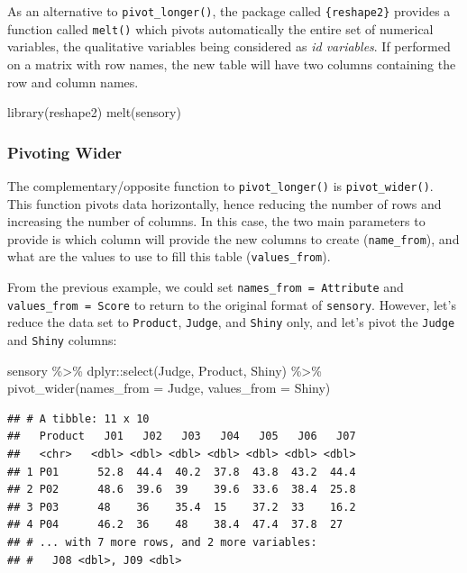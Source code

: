 \documentclass[
]{krantz}
\makeatletter
\newenvironment{Shaded}{\begin{snugshade}}{\end{snugshade}}
\newcommand{\AttributeTok}[1]{\textcolor[rgb]{0.61,0.61,0.61}{#1}}
\newcommand{\FunctionTok}[1]{\textcolor[rgb]{0,0,0}{#1}}
\newcommand{\NormalTok}[1]{#1}
\newcommand{\SpecialCharTok}[1]{\textcolor[rgb]{0,0,0}{#1}}
\newenvironment{kframe}{%
\medskip{}
\setlength{\fboxsep}{.8em}
 \def\at@end@of@kframe{}%
 \ifinner\ifhmode%
  \def\at@end@of@kframe{\end{minipage}}%
  \begin{minipage}{\columnwidth}%
 \fi\fi%
 \def\FrameCommand##1{\hskip\@totalleftmargin \hskip-\fboxsep
 \colorbox{shadecolor}{##1}\hskip-\fboxsep
     \hskip-\linewidth \hskip-\@totalleftmargin \hskip\columnwidth}%
 \MakeFramed {\advance\hsize-\width
   \@totalleftmargin\z@ \linewidth\hsize
   \@setminipage}}%
 {\par\unskip\endMakeFramed%
 \at@end@of@kframe}
\renewenvironment{Shaded}{\begin{kframe}}{\end{kframe}}
\makeatother
\begin{document}
As an alternative to \texttt{pivot\_longer()}, the package called \texttt{\{reshape2\}} provides a function called \texttt{melt()} which pivots automatically the entire set of numerical variables, the qualitative variables being considered as \emph{id variables}. If performed on a matrix with row names, the new table will have two columns containing the row and column names.

\begin{Shaded}
\begin{Highlighting}[]
\FunctionTok{library}\NormalTok{(reshape2)}
\FunctionTok{melt}\NormalTok{(sensory)}
\end{Highlighting}
\end{Shaded}

\hypertarget{pivoting-wider}{%
\subsubsection*{Pivoting Wider}\label{pivoting-wider}}


The complementary/opposite function to \texttt{pivot\_longer()} is \texttt{pivot\_wider()}. This function pivots data horizontally, hence reducing the number of rows and increasing the number of columns. In this case, the two main parameters to provide is which column will provide the new columns to create (\texttt{name\_from}), and what are the values to use to fill this table (\texttt{values\_from}).

From the previous example, we could set \texttt{names\_from\ =\ Attribute} and \texttt{values\_from\ =\ Score} to return to the original format of \texttt{sensory}. However, let's reduce the data set to \texttt{Product}, \texttt{Judge}, and \texttt{Shiny} only, and let's pivot the \texttt{Judge} and \texttt{Shiny} columns:

\begin{Shaded}
\begin{Highlighting}[]
\NormalTok{sensory }\SpecialCharTok{\%\textgreater{}\%}
\NormalTok{  dplyr}\SpecialCharTok{::}\FunctionTok{select}\NormalTok{(Judge, Product, Shiny) }\SpecialCharTok{\%\textgreater{}\%}
  \FunctionTok{pivot\_wider}\NormalTok{(}\AttributeTok{names\_from =}\NormalTok{ Judge, }\AttributeTok{values\_from =}\NormalTok{ Shiny)}
\end{Highlighting}
\end{Shaded}

\begin{verbatim}
## # A tibble: 11 x 10
##   Product   J01   J02   J03   J04   J05   J06   J07
##   <chr>   <dbl> <dbl> <dbl> <dbl> <dbl> <dbl> <dbl>
## 1 P01      52.8  44.4  40.2  37.8  43.8  43.2  44.4
## 2 P02      48.6  39.6  39    39.6  33.6  38.4  25.8
## 3 P03      48    36    35.4  15    37.2  33    16.2
## 4 P04      46.2  36    48    38.4  47.4  37.8  27  
## # ... with 7 more rows, and 2 more variables:
## #   J08 <dbl>, J09 <dbl>
\end{verbatim}
\end{document}
